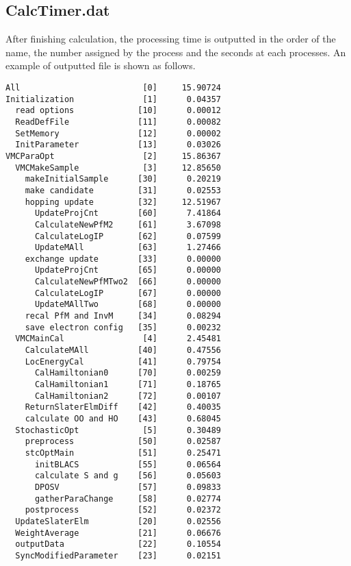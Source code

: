 \subsection{CalcTimer.dat }
After finishing calculation, the processing time is outputted in the order of the name, the number assigned by the process and the seconds at each processes. An example of outputted file is shown as follows.

\begin{minipage}{15.5cm}
\begin{screen}
\begin{verbatim}
All                         [0]     15.90724
Initialization              [1]      0.04357
  read options             [10]      0.00012
  ReadDefFile              [11]      0.00082
  SetMemory                [12]      0.00002
  InitParameter            [13]      0.03026
VMCParaOpt                  [2]     15.86367
  VMCMakeSample             [3]     12.85650
    makeInitialSample      [30]      0.20219
    make candidate         [31]      0.02553
    hopping update         [32]     12.51967
      UpdateProjCnt        [60]      7.41864
      CalculateNewPfM2     [61]      3.67098
      CalculateLogIP       [62]      0.07599
      UpdateMAll           [63]      1.27466
    exchange update        [33]      0.00000
      UpdateProjCnt        [65]      0.00000
      CalculateNewPfMTwo2  [66]      0.00000
      CalculateLogIP       [67]      0.00000
      UpdateMAllTwo        [68]      0.00000
    recal PfM and InvM     [34]      0.08294
    save electron config   [35]      0.00232
  VMCMainCal                [4]      2.45481
    CalculateMAll          [40]      0.47556
    LocEnergyCal           [41]      0.79754
      CalHamiltonian0      [70]      0.00259
      CalHamiltonian1      [71]      0.18765
      CalHamiltonian2      [72]      0.00107
    ReturnSlaterElmDiff    [42]      0.40035
    calculate OO and HO    [43]      0.68045
  StochasticOpt             [5]      0.30489
    preprocess             [50]      0.02587
    stcOptMain             [51]      0.25471
      initBLACS            [55]      0.06564
      calculate S and g    [56]      0.05603
      DPOSV                [57]      0.09833
      gatherParaChange     [58]      0.02774
    postprocess            [52]      0.02372
  UpdateSlaterElm          [20]      0.02556
  WeightAverage            [21]      0.06676
  outputData               [22]      0.10554
  SyncModifiedParameter    [23]      0.02151\end{verbatim}
\end{screen}
\end{minipage}


